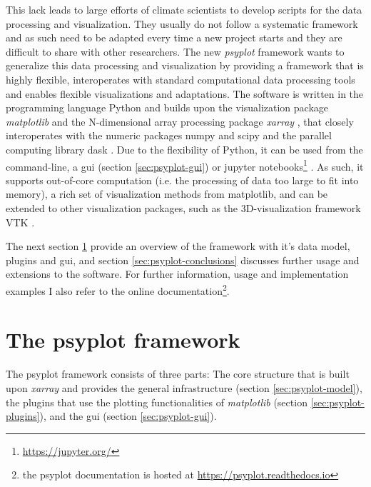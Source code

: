 \begin{refsection}
This lack leads to large efforts of climate scientists to develop scripts for the data processing and visualization. They usually do not follow a systematic framework and as such need to be adapted every time a new project starts and they are difficult to share with other researchers. The new \textit{psyplot} framework wants to generalize this data processing and visualization by providing a framework that is highly flexible, interoperates with standard computational data processing tools and enables flexible visualizations and adaptations. The software is written in the programming language Python \citep{PerezGrangerHunter2011} and builds upon the visualization package \textit{matplotlib} \citep{Hunter2007} and the N-dimensional array processing package \textit{xarray} \citep{HoyerHamman2017}, that closely interoperates with the numeric packages numpy and scipy \citep{JonesOliphantPetersonEtAl2001, Oliphant2006} and the parallel computing library dask \citep{DDT2016}. Due to the flexibility of Python, it can be used from the command-line, a \gls{gui} (section \ref{sec:psyplot-gui}) or jupyter notebooks\footnote{\url{https://jupyter.org/}} \citep{KluyverRaganKelleyPerezEtAl2016}. As such, it supports out-of-core computation (i.e. the processing of data too large to fit into memory), a rich set of visualization methods from matplotlib, and can be extended to other visualization packages, such as the 3D-visualization framework VTK \citep{Sommer2019a}.

The next section \ref{sec:psyplot-framework} provide an overview of the framework with it's data model, plugins and \gls{gui}, and section \ref{sec:psyplot-conclusions} discusses further usage and extensions to the software. For further information, usage and implementation examples I also refer to the online documentation\footnote{the psyplot documentation is hosted at \url{https://psyplot.readthedocs.io}}.

\section{The psyplot framework}  \label{sec:psyplot-framework}

The psyplot framework consists of three parts: The core structure that is built upon \textit{xarray} and provides the general infrastructure (section \ref{sec:psyplot-model}), the plugins that use the plotting functionalities of \textit{matplotlib} (section \ref{sec:psyplot-plugins}), and the \gls{gui} (section \ref{sec:psyplot-gui}).



\end{refsection}

